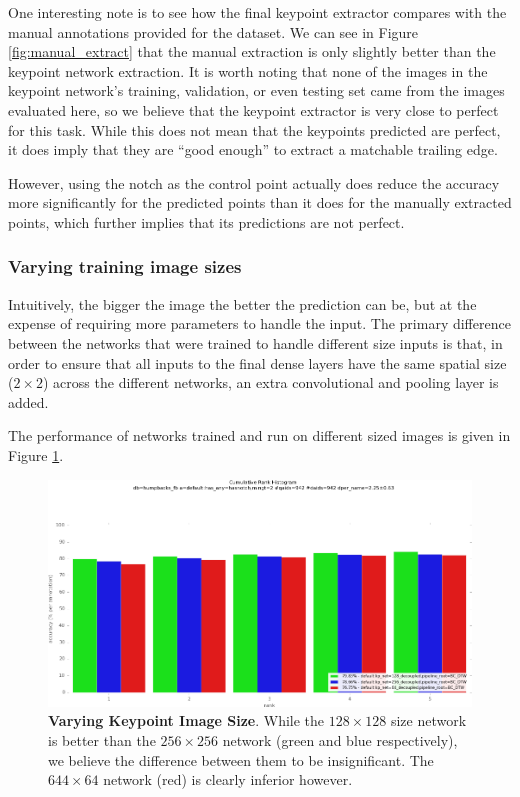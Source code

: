 One interesting note is to see how the final keypoint extractor compares with the manual annotations provided for the dataset.
We can see in Figure \ref{fig:manual_extract} that the manual extraction is only slightly better than the keypoint network extraction.
It is worth noting that none of the images in the keypoint network's training, validation, or even testing set came from the images evaluated here, so we believe that the keypoint extractor is very close to perfect for this task.
While this does not mean that the keypoints predicted are perfect, it does imply that they are ``good enough'' to extract a matchable trailing edge.

However, using the notch as the control point actually does reduce the accuracy more significantly for the predicted points than it does for the manually extracted points, which further implies that its predictions are not perfect.

\subsubsection{Varying training image sizes}

Intuitively, the bigger the image the better the prediction can be, but at the expense of requiring more parameters to handle the input.
The primary difference between the networks that were trained to handle different size inputs is that, in order to ensure that all inputs to the final dense layers have the same spatial size ($2\times2$) across the different networks, an extra convolutional and pooling layer is added.

The performance of networks trained and run on different sized images is given in Figure \ref{fig:vary_kp_size}.

\begin{figure}[t]%
\centering
\includegraphics[width=1\textwidth]{../images/results/vary_kp_size.png}
\caption[]{\textbf{Varying Keypoint Image Size}. While the $128 \times 128$ size network is better than the $256 \times 256$ network (green and blue respectively), we believe the difference between them to be insignificant. The $644 \times 64$ network (red) is clearly inferior however. }
\label{fig:vary_kp_size}
\end{figure}


